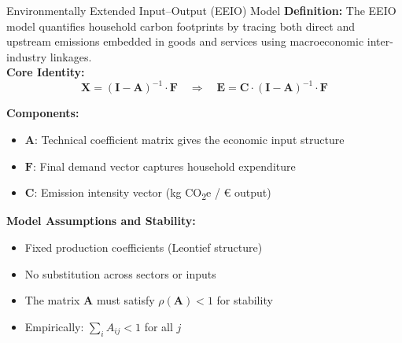 \documentclass{beamer}
\begin{document}
\begin{frame}{Environmentally Extended Input–Output (EEIO) Model}
\footnotesize
\vspace{-2.5em}
\pause
\textbf{Definition:}  
The EEIO model quantifies household carbon footprints by tracing both direct and upstream emissions embedded in goods and services using macroeconomic inter-industry linkages.\\
\pause
\vspace{0.5em}
\textbf{Core Identity:}
\[
\mathbf{X} = (\mathbf{I} - \mathbf{A})^{-1} \cdot \mathbf{F}
\quad
\Rightarrow
\quad
\mathbf{E} = \mathbf{C} \cdot (\mathbf{I} - \mathbf{A})^{-1} \cdot \mathbf{F}
\]

\vspace{0.5em}
\textbf{Components:}
\begin{itemize}
  \item \( \mathbf{A} \): Technical coefficient matrix gives the economic input structure
  \item \( \mathbf{F} \): Final demand vector captures household expenditure
  \item \( \mathbf{C} \): Emission intensity vector (kg CO\textsubscript{2}e / € output)
\end{itemize}

\vspace{0.5em}
\vspace{0.5em}
\pause
\textbf{Model Assumptions and Stability:}
\begin{itemize}
  \item Fixed production coefficients (Leontief structure)
  \item No substitution across sectors or inputs
  \item The matrix \( \mathbf{A} \) must satisfy \( \rho(\mathbf{A}) < 1 \) for stability
  \item Empirically: \( \sum_i A_{ij} < 1 \) for all \( j \)
\end{itemize}

\end{frame}
\end{document}
